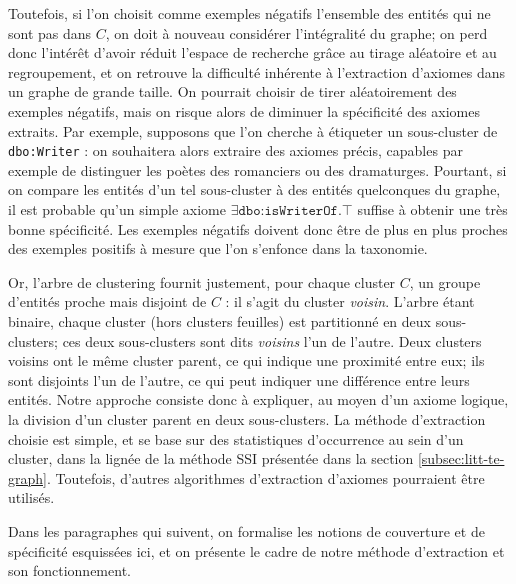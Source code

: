 Toutefois, si l'on choisit comme exemples négatifs l'ensemble des entités qui ne sont pas dans $C$, on doit à nouveau considérer l'intégralité du graphe; on perd donc l'intérêt d'avoir réduit l'espace de recherche grâce au tirage aléatoire et au regroupement, et on retrouve la difficulté inhérente à l'extraction d'axiomes dans un graphe de grande taille.
On pourrait choisir de tirer aléatoirement des exemples négatifs, mais on risque alors de diminuer la spécificité des axiomes extraits. Par exemple, supposons que l'on cherche à étiqueter un sous-cluster de \texttt{dbo:Writer} : on souhaitera alors extraire des axiomes précis, capables par exemple de distinguer les poètes des romanciers ou des dramaturges. Pourtant, si on compare les entités d'un tel sous-cluster à des entités quelconques du graphe, il est probable qu'un simple axiome $\exists \texttt{dbo:isWriterOf}.\top$ suffise à obtenir une très bonne spécificité. Les exemples négatifs doivent donc être de plus en plus proches des exemples positifs à mesure que l'on s'enfonce dans la taxonomie.


Or, l'arbre de clustering fournit justement, pour chaque cluster $C$, un groupe d'entités proche mais disjoint de $C$ : il s'agit du cluster \textit{voisin}. L'arbre étant binaire, chaque cluster (hors clusters feuilles) est partitionné en deux sous-clusters; ces deux sous-clusters sont dits \textit{voisins} l'un de l'autre. Deux clusters voisins ont le même cluster parent, ce qui indique une proximité entre eux; ils sont disjoints l'un de l'autre, ce qui peut indiquer une différence entre leurs entités. Notre approche consiste donc à expliquer, au moyen d'un axiome logique, la division d'un cluster parent en deux sous-clusters. 
La méthode d'extraction choisie est simple, et se base sur des statistiques d'occurrence au sein d'un cluster, dans la lignée de la méthode SSI présentée dans la section \ref{subsec:litt-te-graph}. %
Toutefois, d'autres algorithmes d'extraction d'axiomes pourraient être utilisés. 

Dans les paragraphes qui suivent, on formalise les notions de couverture et de spécificité esquissées ici, et on présente le cadre de notre méthode d'extraction et son fonctionnement.

